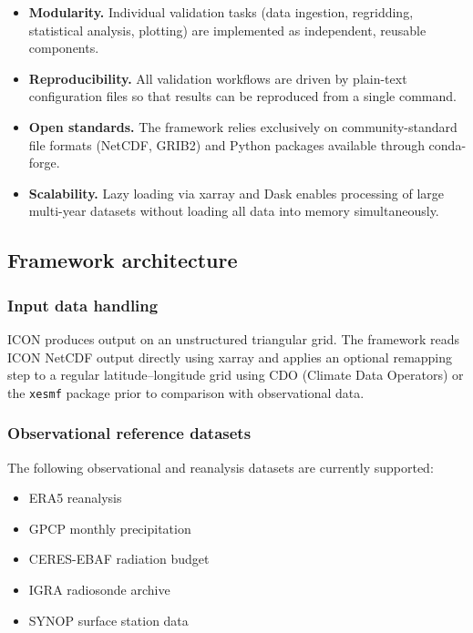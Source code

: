 \documentclass[gmd, manuscript]{copernicus}
\begin{document}
\begin{itemize}
  \item \textbf{Modularity.}  Individual validation tasks (data ingestion,
        regridding, statistical analysis, plotting) are implemented as
        independent, reusable components.
  \item \textbf{Reproducibility.}  All validation workflows are driven by
        plain-text configuration files so that results can be reproduced
        from a single command.
  \item \textbf{Open standards.}  The framework relies exclusively on
        community-standard file formats (NetCDF, GRIB2) and Python
        packages available through conda-forge.
  \item \textbf{Scalability.}  Lazy loading via xarray and Dask enables
        processing of large multi-year datasets without loading all data
        into memory simultaneously.
\end{itemize}

\subsection{Framework architecture}

\subsubsection{Input data handling}

ICON produces output on an unstructured triangular grid.
The framework reads ICON NetCDF output directly using xarray and applies
an optional remapping step to a regular latitude--longitude grid using
CDO (Climate Data Operators) or the \texttt{xesmf} package prior to
comparison with observational data.

\subsubsection{Observational reference datasets}

The following observational and reanalysis datasets are currently supported:

\begin{itemize}
  \item ERA5 reanalysis \citep{hersbach2020era5}
  \item GPCP monthly precipitation \citep{adler2018gpcp}
  \item CERES-EBAF radiation budget \citep{loeb2018ceres}
  \item IGRA radiosonde archive
  \item SYNOP surface station data
\end{itemize}
\end{document}
